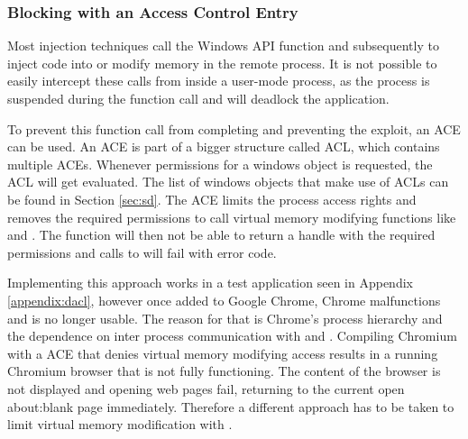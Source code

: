 \subsubsection{Blocking  with an Access Control Entry}
\label{sec:dacl}
Most injection techniques call the Windows \gls{API} function  and subsequently  to inject code into or modify memory in the remote process. It is not possible to easily intercept these calls from inside a user-mode process, as the process is suspended during the  function call and will deadlock the application.

\medskip

To prevent this function call from completing and preventing the exploit, an \gls{ACE} can be used. An \gls{ACE} is part of a bigger structure called \gls{ACL}, which contains multiple \glspl{ACE}. Whenever permissions for a windows object is requested, the \gls{ACL} will get evaluated. The list of windows objects that make use of \glspl{ACL} can be found in Section \ref{sec:sd}. The \gls{ACE} limits the process access rights and removes the required permissions to call virtual memory modifying functions like  and . The  function will then not be able to return a handle with the required permissions and calls to  will fail with  error code.

\medskip

Implementing this approach works in a test application seen in Appendix \ref{appendix:dacl}, however once added to Google Chrome, Chrome malfunctions and is no longer usable. The reason for that is Chrome's process hierarchy and the dependence on inter process communication with  and . Compiling Chromium with a \gls{ACE} that denies virtual memory modifying access results in a running Chromium browser that is not fully functioning. The content of the browser is not displayed and opening web pages fail, returning to the current open about:blank page immediately. Therefore a different approach has to be taken to limit virtual memory modification with .